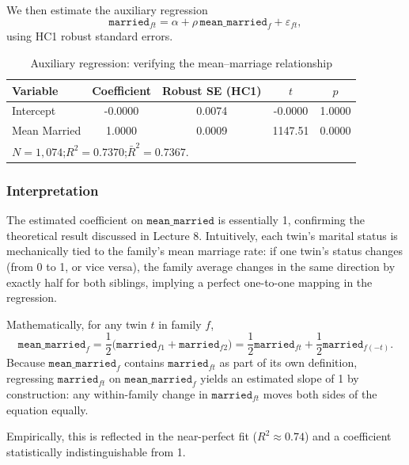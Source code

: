 \documentclass[12pt]{article}
\begin{document}
We then estimate the auxiliary regression
\[
  \texttt{married}_{ft} = \alpha + \rho\,\texttt{mean\_married}_{f} + \varepsilon_{ft},
\]
using HC1 robust standard errors.

\begin{table}[h!]
  \centering
  \caption{Auxiliary regression: verifying the mean–marriage relationship}
  \label{tab:q3a_aux}
  \small
  \begin{tabular}{l
                  S[table-format=1.4]
                  S[table-format=1.4]
                  S[table-format=2.2]
                  S[table-format=1.3]}
    \toprule
    Variable & {Coefficient} & {Robust SE (HC1)} & {$t$} & {$p$} \\
    \midrule
    Intercept       & -0.0000 & 0.0074 & -0.0000 & 1.0000 \\
    Mean Married    &  1.0000 & 0.0009 & 1147.51 & 0.0000 \\
    \midrule
     \\
    \bottomrule
  \end{tabular}
\end{table}

\subsubsection*{Interpretation}
The estimated coefficient on \(\texttt{mean\_married}\) is essentially 1, confirming the theoretical result discussed in Lecture 8.  
Intuitively, each twin’s marital status is mechanically tied to the family’s mean marriage rate: if one twin’s status changes (from 0 to 1, or vice versa), the family average changes in the same direction by exactly half for both siblings, implying a perfect one-to-one mapping in the regression. 

Mathematically, for any twin \(t\) in family \(f\),
\[
  \texttt{mean\_married}_{f}
  = \frac{1}{2}\big(\texttt{married}_{f1} + \texttt{married}_{f2}\big)
  = \frac{1}{2}\texttt{married}_{ft} + \frac{1}{2}\texttt{married}_{f(-t)}.
\]
Because \(\texttt{mean\_married}_f\) contains \(\texttt{married}_{ft}\) as part of its own definition, regressing \(\texttt{married}_{ft}\) on \(\texttt{mean\_married}_f\) yields an estimated slope of 1 by construction: any within-family change in \(\texttt{married}_{ft}\) moves both sides of the equation equally.

Empirically, this is reflected in the near-perfect fit (\(R^2\approx0.74\)) and a coefficient statistically indistinguishable from 1.
\end{document}
